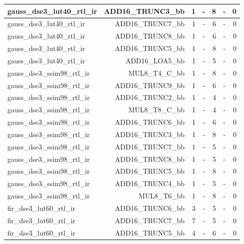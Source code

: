\begin{table}[htbp]
\begin{tabular}{|l|r|r|r|r|r|r|}
gauss\_dse3\_lut40\_rtl\_ir & ADD16\_TRUNC3\_bb & 1 & - & 8 & - & 0 \\ \hline
gauss\_dse3\_lut40\_rtl\_ir & ADD16\_TRUNC7\_bb & 1 & - & 6 & - & 0 \\ \hline
gauss\_dse3\_lut40\_rtl\_ir & ADD16\_TRUNC8\_bb & 1 & - & 6 & - & 0 \\ \hline
gauss\_dse3\_lut40\_rtl\_ir & ADD16\_TRUNC5\_bb & 1 & - & 8 & - & 0 \\ \hline
gauss\_dse3\_lut40\_rtl\_ir & ADD16\_LOA5\_bb & 1 & - & 5 & - & 0 \\ \hline
gauss\_dse3\_ssim98\_rtl\_ir & MUL8\_T4\_C\_bb & 1 & - & 8 & - & 0 \\ \hline
gauss\_dse3\_ssim98\_rtl\_ir & ADD16\_TRUNC9\_bb & 1 & - & 6 & - & 0 \\ \hline
gauss\_dse3\_ssim98\_rtl\_ir & ADD16\_TRUNC2\_bb & 1 & - & 4 & - & 0 \\ \hline
gauss\_dse3\_ssim98\_rtl\_ir & MUL8\_T8\_C\_bb & 1 & - & 4 & - & 0 \\ \hline
gauss\_dse3\_ssim98\_rtl\_ir & ADD16\_TRUNC6\_bb & 1 & - & 6 & - & 0 \\ \hline
gauss\_dse3\_ssim98\_rtl\_ir & ADD16\_TRUNC3\_bb & 1 & - & 8 & - & 0 \\ \hline
gauss\_dse3\_ssim98\_rtl\_ir & ADD16\_TRUNC7\_bb & 1 & - & 5 & - & 0 \\ \hline
gauss\_dse3\_ssim98\_rtl\_ir & ADD16\_TRUNC8\_bb & 1 & - & 5 & - & 0 \\ \hline
gauss\_dse3\_ssim98\_rtl\_ir & ADD16\_TRUNC5\_bb & 1 & - & 8 & - & 0 \\ \hline
gauss\_dse3\_ssim98\_rtl\_ir & ADD16\_TRUNC4\_bb & 1 & - & 5 & - & 0 \\ \hline
gauss\_dse3\_ssim98\_rtl\_ir & MUL8\_T6\_bb & 1 & - & 8 & - & 0 \\ \hline
fir\_dse3\_lut60\_rtl\_ir & ADD16\_TRUNC6\_bb & 3 & - & 5 & - & 0 \\ \hline
fir\_dse3\_lut60\_rtl\_ir & ADD16\_TRUNC7\_bb & 7 & - & 5 & - & 0 \\ \hline
fir\_dse3\_lut60\_rtl\_ir & ADD16\_TRUNC5\_bb & 4 & - & 6 & - & 0 \\ \hline
\end{tabular}
\end{table}


